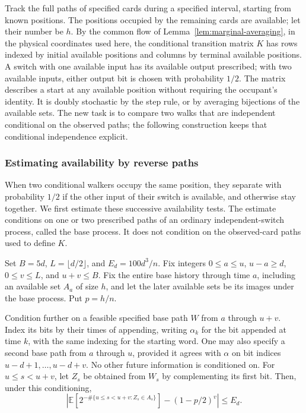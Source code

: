 \label{c:probes:p005}

Track the full paths of specified cards during a specified interval,
starting from known positions. The positions occupied by the remaining
cards are available; let their number be \(h\). By the common flow of
Lemma~\ref{lem:marginal-averaging}, in the physical coordinates used
here, the conditional transition matrix \(K\) has rows indexed by
initial available positions and columns by terminal available positions.
A switch with one available input has its available output prescribed;
with two available inputs, either output bit is chosen with probability
\(1/2\). The matrix describes a start at any available position without
requiring the occupant's identity. It is doubly stochastic by the step
rule, or by averaging bijections of the available sets. The new task is
to compare two walks that are independent conditional on the observed
paths; the following construction keeps that conditional independence
explicit.

\label{c:probes:p006}

\subsubsection{Estimating availability by reverse paths}

When two conditional walkers occupy the same position, they separate
with probability $1/2$ if the other input of their switch is available,
and otherwise stay together. We first estimate these successive
availability tests. The estimate conditions on one or two prescribed
paths of an ordinary independent-switch process, called the base
process. It does not condition on the observed-card paths used to
define $K$.

\begin{lemma}
\label{lem:c-reverse-probes}
Set $B=5d$, $L=\lfloor d/2\rfloor$, and $E_d=100d^3/n$.
Fix integers $0\le a\le u$, $u-a\ge d$, $0\le v\le L$, and
$u+v\le B$. Fix the entire base history through time $a$, including
an available set $A_a$ of size $h$, and let the later available sets be
its images under the base process. Put $p=h/n$.

Condition further on a feasible specified base path $W$ from $a$
through $u+v$. Index its bits by their times of appending, writing
$\alpha_k$ for the bit appended at time $k$, with the same indexing
for the starting word. One may also specify a second base path from
$a$ through $u$, provided it agrees with $\alpha$ on bit indices
$u-d+1,\ldots,u-d+v$. No other future information is conditioned on.
For $u\le s<u+v$, let $Z_s$ be obtained from $W_s$ by
complementing its first bit. Then, under this conditioning,
\begin{equation}
 \left|\mathbb E\!\left[2^{-\#\{u\le s<u+v:Z_s\in A_s\}}\right]
             -(1-p/2)^v\right|\le E_d.
 \label{c:probes:eq:3}
\end{equation}
\end{lemma}

